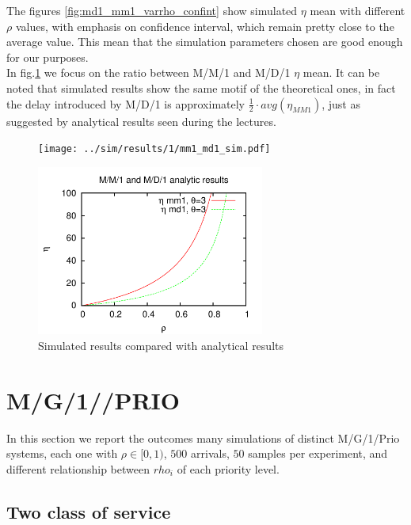 \documentclass{llncs}
\newcommand{\labelsec}[1]{\label{sec:#1}}
\begin{document}
The figures \ref{fig:md1_mm1_varrho_confint} show simulated $\eta$ mean with different $\rho$ values, with emphasis on confidence interval, which remain pretty close to the average value. This mean that the simulation parameters chosen are good enough for our purposes.\\
In fig.\ref{fig:md1_mm1_varrho_compare} we focus on the ratio between M/M/1 and M/D/1 $\eta$ mean. It can be noted that simulated results show the same motif of the theoretical ones, in fact the delay introduced by M/D/1 is approximately $\frac{1}{2} \cdot avg(\eta_ {MM1})$, just as suggested by analytical results seen during the lectures.

\begin{figure}
\begin{minipage}[b]{7.5cm}
\centering
\texttt{[image: ../sim/results/1/mm1\_md1\_sim.pdf]}
\end{minipage}\qquad
\begin{minipage}[b]{7.5cm}
\centering
\includegraphics[width=7.5cm]{../sim/results/1/mm1_md1_theorical.pdf}
\end{minipage}
\caption{Simulated results compared with analytical results}
\label{fig:md1_mm1_varrho_compare}
\end{figure}

\newpage
\section{M/G/1//PRIO}
\labelsec{MG1PRIO}

In this section we report the outcomes many simulations of distinct M/G/1/Prio systems, each one with $\rho \in [0,1)$, $500$ arrivals, $50$ samples per experiment, and different relationship between $rho_i$ of each priority level.


\subsection{Two class of service}
\labelsec{MG1PRIO_2class}
\end{document}
